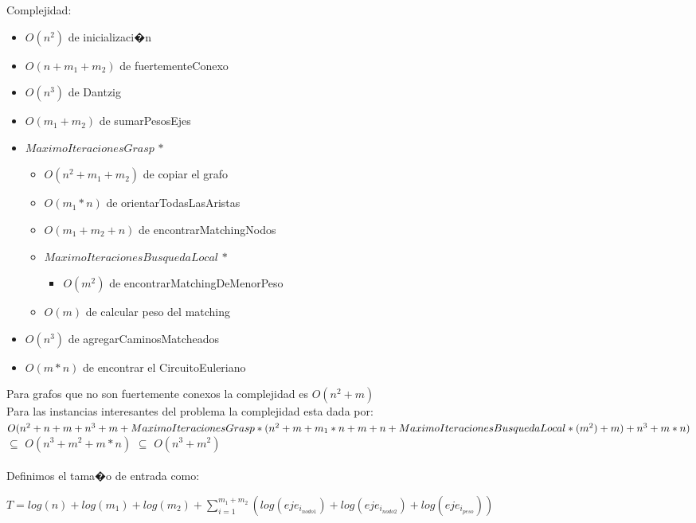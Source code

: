\documentclass[11pt, a4paper, spanish]{article}
\begin{document}
\newpage

Complejidad:
	\begin{itemize}
	\item $O(n^{2})$ de inicializaci�n
	\item $O(n + m_{1} + m_{2})$ de fuertementeConexo
	\item $O(n^{3})$ de Dantzig
	\item $O(m_{1} + m_{2})$ de sumarPesosEjes
	\item $MaximoIteracionesGrasp$ $*$
	\begin{itemize}
		\item $O(n^{2} + m_{1} + m_{2})$ de copiar el grafo
		\item $O(m_{1} * n)$ de orientarTodasLasAristas
		\item $O(m_{1} + m_{2} + n)$ de encontrarMatchingNodos
		\item $MaximoIteracionesBusquedaLocal$ $*$
		\begin{itemize}
			\item $O(m^{2})$ de encontrarMatchingDeMenorPeso
		\end{itemize}
		\item $O(m)$ de calcular peso del matching
	\end{itemize}
	\item $O(n^{3})$ de agregarCaminosMatcheados
	\item $O(m*n)$ de encontrar el CircuitoEuleriano
	\end{itemize} 
Para grafos que no son fuertemente conexos la complejidad es $O(n^{2} + m)$\\
Para las instancias interesantes del problema la complejidad esta dada por:\\
$O(n^{2} + n + m + n^{3} + m + \\MaximoIteracionesGrasp*(n^{2} + m + m_{1} * n + m + n + MaximoIteracionesBusquedaLocal*(m^{2}) + m ) + n^{3} + m*n)$ $\subseteq$
$O(n^{3} + m^{2} + m*n)$ $\subseteq$ $O(n^{3} + m^{2})$\\
\\
Definimos el tama�o de entrada como:

	\begin{center}	
	$T = log(n) + log(m_{1}) + log(m_{2}) + \displaystyle\sum_{i=1}^{m_{1} + m_{2}}{(log(eje_{i_{nodo1}})+log(eje_{i_{nodo2}}) + log(eje_{i_{peso}}))}$\\
	\end{center}
\end{document}

